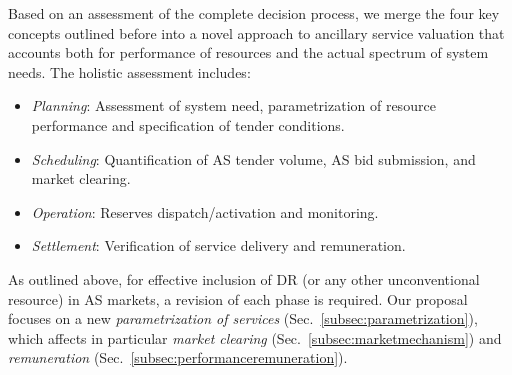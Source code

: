 


Based on an assessment of the complete decision process, we merge the four key concepts outlined before into a novel approach to ancillary service valuation that accounts both for performance of resources and the actual spectrum of system needs.  %
The holistic assessment includes:
\begin{itemize}
	\item \textit{Planning}: Assessment of system need, parametrization of resource performance and specification of tender conditions.

	\item \textit{Scheduling}: Quantification of AS tender volume, AS bid submission, and market clearing.

	\item \textit{Operation}: Reserves dispatch/activation and monitoring.

	\item \textit{Settlement}: Verification of service delivery and remuneration.
\end{itemize}

As outlined above, for effective inclusion of DR (or any other unconventional resource) in AS markets, a revision of each phase is required. Our proposal focuses on a new \textit{parametrization of services} (Sec.~\ref{subsec:parametrization}), which affects in particular \textit{market clearing} (Sec.~\ref{subsec:marketmechanism}) and \textit{remuneration} (Sec.~\ref{subsec:performanceremuneration}). 

